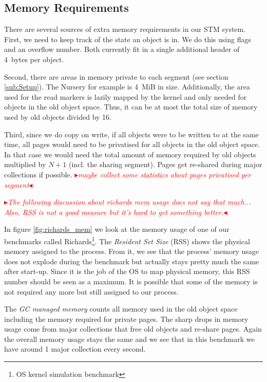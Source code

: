 \documentclass{sigplanconf}
\newcommand{\mynote}[2]{%
  \textcolor{red}{%
    \fbox{\bfseries\sffamily\scriptsize#1}%
    {\small$\blacktriangleright$\textsf{\emph{#2}}$\blacktriangleleft$}%
  }%
}
\newcommand\remi[1]{\mynote{Remi}{#1}}
\begin{document}



\subsection{Memory Requirements}

There are several sources of extra memory requirements in our
STM system. First, we need to keep track of the state an object
is in. We do this using flags and an overflow number. Both currently
fit in a single additional header of 4~bytes per object.

Second, there are areas in memory private to each segment (see
section \ref{sub:Setup}). The Nursery for example is 4~MiB in
size. Additionally, the area used for the read markers is lazily
mapped by the kernel and only needed for objects in the old object
space. Thus, it can be at most the total size of memory used by
old objects divided by 16.

Third, since we do copy on write, if all objects were to be
written to at the same time, all pages would need to be privatised
for all objects in the old object space. In that case we would
need the total amount of memory required by old objects multiplied
by $N+1$ (incl. the sharing segment). Pages get re-shared during
major collections if possible.
\remi{maybe collect some statistics about pages privatised per segment}

\remi{The following discussion about richards mem usage does not
say that much... Also, RSS is not a good measure but it's hard to
get something better.}
In figure \ref{fig:richards_mem} we look at the memory usage of
one of our benchmarks called Richards\footnote{OS kernel simulation
benchmark}. The \emph{Resident Set Size} (RSS) shows the physical memory
assigned to the process. From it, we see that the process' memory
usage does not explode during the benchmark but actually stays pretty
much the same after start-up. Since it is the job of the OS to map
physical memory, this RSS number should be seen as a maximum. It is
possible that some of the memory is not required any more but still
assigned to our process.

The \emph{GC managed memory} counts all memory used in the old object
space including the memory required for private pages. The sharp drops
in memory usage come from major collections that free old objects and
re-share pages. Again the overall memory usage stays the same and
we see that in this benchmark we have around 1 major collection every
second.
\end{document}
